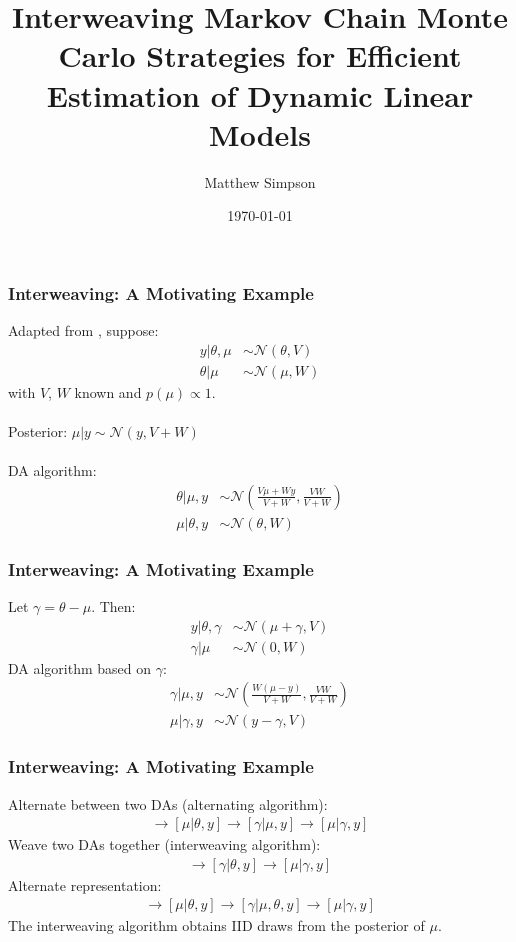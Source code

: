 \documentclass[xcolor=dvipsnames]{beamer}
\title[Interweaving MCMC Strats for DLMs]{Interweaving Markov Chain Monte Carlo Strategies for Efficient
Estimation of Dynamic Linear Models}
\author[M. Simpson]{Matthew Simpson}
\date{\today}
\institute[Deps of Stat \& Econ, ISU]{Departments of Statistics and Economics, Iowa State University}
\newcommand\N{\mathcal{N}}
\begin{document}
\begin{frame}
\titlepage
\end{frame}

\begin{frame}
\frametitle{Interweaving: A Motivating Example}
Adapted from \citet{yu2011center}, suppose:
\begin{align*}
y|\theta, \mu & \sim \N(\theta, V) \\
\theta|\mu & \sim \N(\mu, W) 
\end{align*}
with $V$, $W$ known and $p(\mu)\propto 1$.\\~\\
Posterior: $\mu|y \sim \N(y, V+W)$\\~\\
DA algorithm:
\begin{align*}
\theta|\mu,y &\sim \N\left(\frac{V\mu + Wy}{V+W}, \frac{VW}{V+W}\right)\\
\mu |\theta, y &\sim \N(\theta, W)
\end{align*}
\end{frame}

\begin{frame}
\frametitle{Interweaving: A Motivating Example}
Let $\gamma = \theta - \mu$. Then:
\begin{align*}
y|\theta, \gamma & \sim \N(\mu + \gamma, V) \\
\gamma|\mu & \sim \N(0, W) 
\end{align*}
DA algorithm based on $\gamma$:
\begin{align*}
\gamma|\mu,y &\sim \N\left(\frac{W(\mu - y)}{V+W}, \frac{VW}{V+W}\right)\\
\mu |\gamma, y &\sim \N(y-\gamma, V)
\end{align*}
\end{frame}

\begin{frame}
\frametitle{Interweaving: A Motivating Example}
Alternate between two DAs (alternating algorithm):
\begin{align*}
[\theta|\mu,y] \to [\mu|\theta,y] \to [\gamma|\mu,y] \to [\mu|\gamma,y]
\end{align*}
Weave two DAs together (interweaving algorithm):
\begin{align*}
[\theta|\mu,y] \to [\gamma|\theta,y] \to [\mu|\gamma,y]
\end{align*}
Alternate representation:
\begin{align*}
[\theta|\mu,y] \to [\mu|\theta,y] \to [\gamma|\mu,\theta,y] \to [\mu|\gamma,y]
\end{align*}
{\color{blue}The interweaving algorithm obtains IID draws from the posterior of $\mu$.}
\end{frame}
\end{document}
